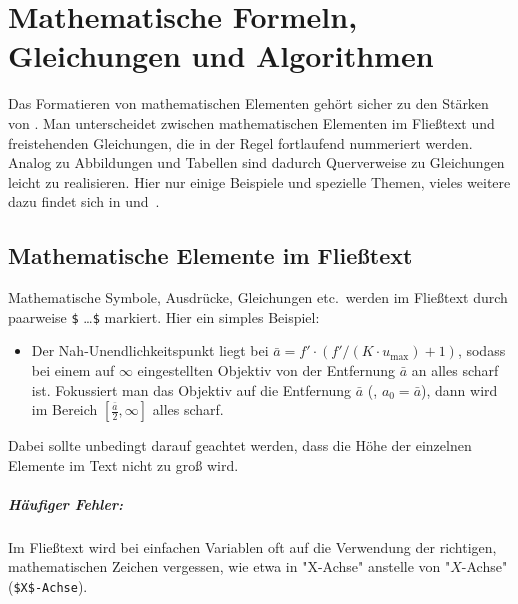 \chapter[Mathem.\ Formeln etc.]{Mathematische Formeln, Gleichungen und Algorithmen}
\label{cha:Mathematik}



Das Formatieren von mathematischen Elementen gehört sicher zu den
Stär\-ken von \latex. Man unterscheidet zwischen mathematischen Elementen
im Fließtext und freistehenden Gleichungen, die in der Regel
fortlaufend nummeriert werden. Analog zu Abbildungen und Tabellen sind dadurch
Querverweise zu Gleichungen leicht zu realisieren.
Hier nur einige Beispiele und spezielle Themen, vieles weitere dazu findet sich \zB in
\cite[Kap.\ 7]{Kopka2003} und~\cite{Voss2014}.


\section{Mathematische Elemente im Fließtext}

Mathematische Symbole, Ausdrücke, Gleichungen etc.\ werden im Fließtext durch paarweise 
\verb!$! \ldots \verb!$! markiert. Hier ein simples Beispiel:
%
\begin{itemize}
\item[]
Der Nah-Unendlichkeitspunkt liegt bei
$\bar{a} = f' \cdot (f' / (K \cdot u_{\max}) + 1)$,
sodass bei einem auf $\infty$ eingestellten Objektiv von der Entfernung
$\bar{a}$ an alles scharf ist. Fokussiert man das
Objektiv auf die Entfernung $\bar{a}$ (\dah, $a_0 = \bar{a}$), dann wird
im Bereich $[\frac{\bar{a}}{2}, \infty]$ alles scharf.
\end{itemize}
%
Dabei sollte unbedingt darauf geachtet werden, dass die Höhe der einzelnen Elemente im Text nicht zu groß wird. 

\paragraph{Häufiger Fehler:} 
Im Fließtext wird bei einfachen Variablen oft auf die Verwendung der richtigen, mathematischen
Zeichen vergessen, wie etwa in "X-Achse" anstelle von "$X$-Achse" (\verb!$X$-Achse!).

